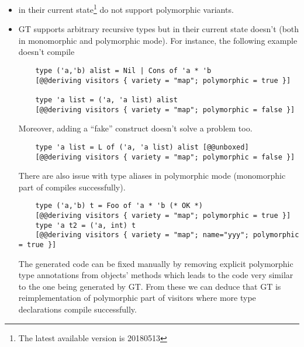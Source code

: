 \begin{itemize}
   \item {} in their current state\footnote{The latest available version is 20180513} do not support polymorphic variants.
   
   \item GT supports arbitrary recursive types but  in their current state doesn't (both in monomorphic and polymorphic mode). For instance, the following example doesn't compile 
   \begin{lstlisting}
    type ('a,'b) alist = Nil | Cons of 'a * 'b
    [@@deriving visitors { variety = "map"; polymorphic = true }]

    type 'a list = ('a, 'a list) alist
    [@@deriving visitors { variety = "map"; polymorphic = false }]
    \end{lstlisting}
    Moreover, adding a ``fake'' construct doesn't solve a problem too.
    \begin{lstlisting}
    type 'a list = L of ('a, 'a list) alist [@@unboxed]
    [@@deriving visitors { variety = "map"; polymorphic = false }]
    \end{lstlisting}
    There are also issue with type aliases in polymorphic mode (monomorphic part of  compiles successfully).
    \begin{lstlisting}
    type ('a,'b) t = Foo of 'a * 'b (* OK *)
    [@@deriving visitors { variety = "map"; polymorphic = true }]
    type 'a t2 = ('a, int) t
    [@@deriving visitors { variety = "map"; name="yyy"; polymorphic = true }]
    \end{lstlisting}
    The generated code can be fixed manually by removing explicit polymorphic type annotations from objects' methods which leads to the code very similar to the one being generated by GT. From these we can deduce that GT is reimplementation of polymorphic part of visitors where more type declarations compile successfully.
\end{itemize}
